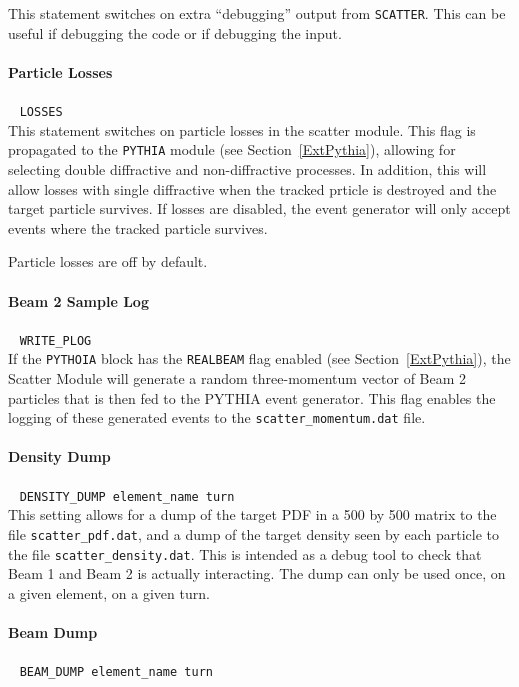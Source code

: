 This statement switches on extra ``debugging'' output from \texttt{SCATTER}.
This can be useful if debugging the code or if debugging the input.

\paragraph{Particle Losses}~ \texttt{LOSSES}\\

This statement switches on particle losses in the scatter module.
This flag is propagated to the \texttt{PYTHIA} module (see Section~\ref{ExtPythia}), allowing for selecting double diffractive and non-diffractive processes.
In addition, this will allow losses with single diffractive when the tracked prticle is destroyed and the target particle survives.
If losses are disabled, the event generator will only accept events where the tracked particle survives.

Particle losses are off by default.

\paragraph{Beam 2 Sample Log}~ \texttt{WRITE\_PLOG}\\

If the \texttt{PYTHOIA} block has the \texttt{REALBEAM} flag enabled (see Section~\ref{ExtPythia}), the Scatter Module will generate a random three-momentum vector of Beam 2 particles that is then fed to the PYTHIA event generator.
This flag enables the logging of these generated events to the \texttt{scatter\_momentum.dat} file.

\paragraph{Density Dump}~ \texttt{DENSITY\_DUMP element\_name turn}\\

This setting allows for a dump of the target PDF in a 500 by 500 matrix to the file \texttt{scatter\_pdf.dat}, and a dump of the target density seen by each particle to the file \texttt{scatter\_density.dat}.
This is intended as a debug tool to check that Beam 1 and Beam 2 is actually interacting.
The dump can only be used once, on a given element, on a given turn.

\paragraph{Beam Dump}~ \texttt{BEAM\_DUMP element\_name turn}\\

